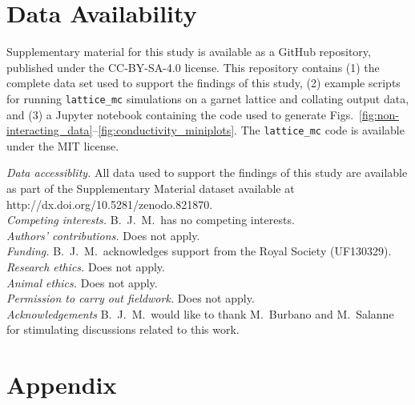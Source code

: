 \documentclass[aps,prb,twocolumn,superscriptaddress,reprint]{revtex4-1}
\begin{document}
\section{Data Availability}
Supplementary material for this study is available as a GitHub repository, published under the CC-BY-SA-4.0 license.\cite{morgan_benjamin_j_2017_821864} This repository contains (1) the complete data set used to support the findings of this study, (2) example scripts for running \texttt{lattice\_mc} simulations on a garnet lattice and collating output data, and (3) a Jupyter notebook containing the code used to generate Figs.\ \ref{fig:non-interacting_data}--\ref{fig:conductivity_miniplots}. The \texttt{lattice\_mc} code is available under the MIT license.\cite{Morgan_JOSS2017}

 

\emph{Data accessiblity.} All data used to support the findings of this study are available as part of the Supplementary Material dataset available at http://dx.doi.org/10.5281/zenodo.821870.\\
\emph{Competing interests.} B.~J.~M.\ has no competing interests.\\
\emph{Authors' contributions.} Does not apply.\\
\emph{Funding.} B.~J.~M.\ acknowledges support from the Royal Society (UF130329).\\
\emph{Research ethics.} Does not apply.\\
\emph{Animal ethics.} Does not apply.\\
\emph{Permission to carry out fieldwork.} Does not apply.\\
\emph{Acknowledgements} B.~J.~M.\ would like to thank M.~Burbano and M.~Salanne for stimulating discussions related to this work.

\section{Appendix}

\renewcommand{\thefigure}{A\arabic{figure}}
\setcounter{figure}{0}
\end{document}
